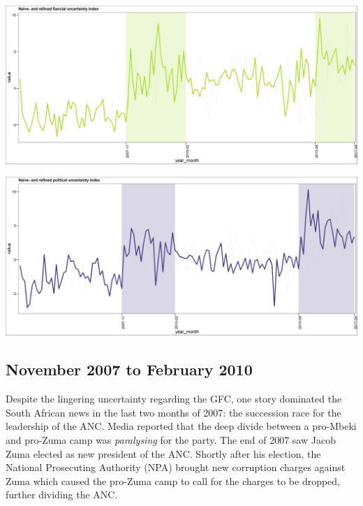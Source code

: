 \documentclass[11pt,preprint, authoryear]{elsarticle}
\let\origfigure\figure
\let\endorigfigure\endfigure
\renewenvironment{figure}[1][2] {
    \expandafter\origfigure\expandafter[H]
} {
    \endorigfigure
}
\numberwithin{equation}{section}
\numberwithin{figure}{section}
\numberwithin{table}{section}
\begin{document}
\begin{figure}
	\centering
	\includegraphics[width=\linewidth, keepaspectratio]{bin/financial_comps}\\
	\caption{Composite Financial market uncertainty refined index. \label{fin_comp_final}}
\end{figure}



\begin{figure}
	\centering
	\includegraphics[width=\linewidth, keepaspectratio]{bin/pol_comps}\\
	\caption{Composite Political uncertainty refined index. \label{pol_comp_final}}
\end{figure}

\subsection{November 2007 to February
2010}\label{november-2007-to-february-2010}

Despite the lingering uncertainty regarding the GFC, one story dominated
the South African news in the last two months of 2007: the succession
race for the leadership of the ANC. Media reported that the deep divide
between a pro-Mbeki and pro-Zuma camp was \emph{paralysing} for the
party. The end of 2007 saw Jacob Zuma elected as new president of the
ANC. Shortly after his election, the National Prosecuting Authority
(NPA) brought new corruption charges against Zuma which caused the
pro-Zuma camp to call for the charges to be dropped, further dividing
the ANC.
\end{document}
